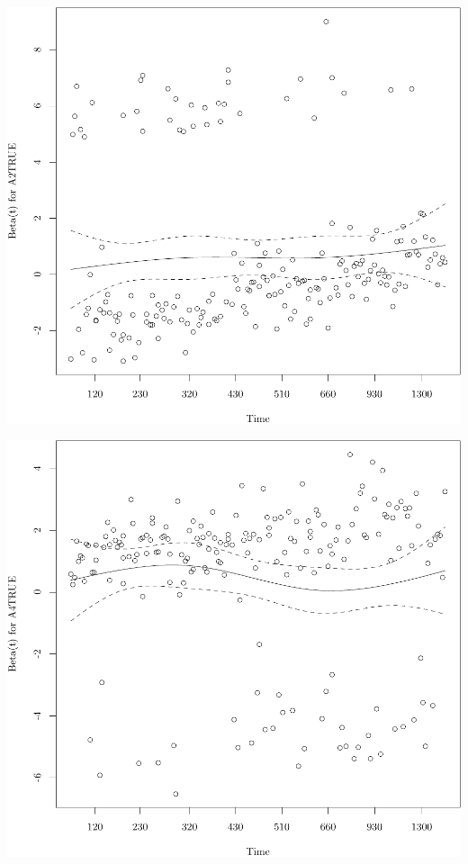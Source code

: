 \documentclass{article}
\begin{document}
\begin{knitrout}
{\centering \includegraphics[width=\maxwidth]{figure/05-eda-ph-check-full-3-6} 

}




{\centering \includegraphics[width=\maxwidth]{figure/05-eda-ph-check-full-3-7} 

}



\end{knitrout}
\end{document}
